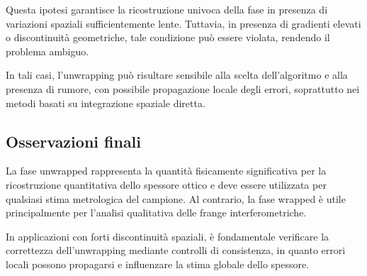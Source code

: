 {Questa ipotesi garantisce la ricostruzione univoca della fase in presenza di variazioni spaziali sufficientemente lente. Tuttavia, in presenza di gradienti elevati o discontinuità geometriche, tale condizione può essere violata, rendendo il problema ambiguo.

In tali casi, l’unwrapping può risultare sensibile alla scelta dell’algoritmo e alla presenza di rumore, con possibile propagazione locale degli errori, soprattutto nei metodi basati su integrazione spaziale diretta.

\subsection{Osservazioni finali}

La fase unwrapped rappresenta la quantità fisicamente significativa per la ricostruzione quantitativa dello spessore ottico e deve essere utilizzata per qualsiasi stima metrologica del campione. Al contrario, la fase wrapped è utile principalmente per l’analisi qualitativa delle frange interferometriche.

In applicazioni con forti discontinuità spaziali, è fondamentale verificare la correttezza dell’unwrapping mediante controlli di consistenza, in quanto errori locali possono propagarsi e influenzare la stima globale dello spessore.
}